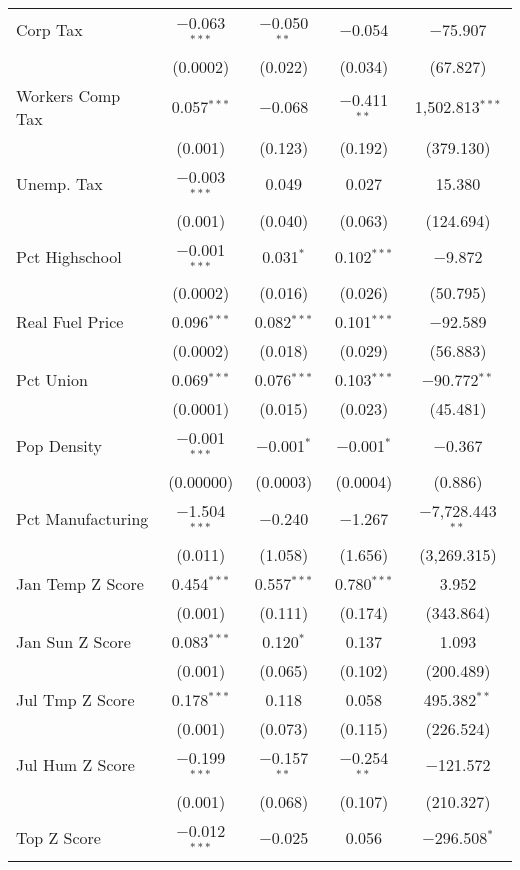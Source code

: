 \begin{table}[!htbp]
\begin{tabular}{@{\extracolsep{5pt}}lcccc}
  Corp Tax & $-$0.063$^{***}$ & $-$0.050$^{**}$ & $-$0.054 & $-$75.907 \\ 
  & (0.0002) & (0.022) & (0.034) & (67.827) \\ 
  Workers Comp Tax & 0.057$^{***}$ & $-$0.068 & $-$0.411$^{**}$ & 1,502.813$^{***}$ \\ 
  & (0.001) & (0.123) & (0.192) & (379.130) \\ 
  Unemp. Tax & $-$0.003$^{***}$ & 0.049 & 0.027 & 15.380 \\ 
  & (0.001) & (0.040) & (0.063) & (124.694) \\ 
  Pct Highschool & $-$0.001$^{***}$ & 0.031$^{*}$ & 0.102$^{***}$ & $-$9.872 \\ 
  & (0.0002) & (0.016) & (0.026) & (50.795) \\ 
  Real Fuel Price & 0.096$^{***}$ & 0.082$^{***}$ & 0.101$^{***}$ & $-$92.589 \\ 
  & (0.0002) & (0.018) & (0.029) & (56.883) \\ 
  Pct Union & 0.069$^{***}$ & 0.076$^{***}$ & 0.103$^{***}$ & $-$90.772$^{**}$ \\ 
  & (0.0001) & (0.015) & (0.023) & (45.481) \\ 
  Pop Density & $-$0.001$^{***}$ & $-$0.001$^{*}$ & $-$0.001$^{*}$ & $-$0.367 \\ 
  & (0.00000) & (0.0003) & (0.0004) & (0.886) \\ 
  Pct Manufacturing & $-$1.504$^{***}$ & $-$0.240 & $-$1.267 & $-$7,728.443$^{**}$ \\ 
  & (0.011) & (1.058) & (1.656) & (3,269.315) \\ 
  Jan Temp Z Score & 0.454$^{***}$ & 0.557$^{***}$ & 0.780$^{***}$ & 3.952 \\ 
  & (0.001) & (0.111) & (0.174) & (343.864) \\ 
  Jan Sun Z Score & 0.083$^{***}$ & 0.120$^{*}$ & 0.137 & 1.093 \\ 
  & (0.001) & (0.065) & (0.102) & (200.489) \\ 
  Jul Tmp Z Score & 0.178$^{***}$ & 0.118 & 0.058 & 495.382$^{**}$ \\ 
  & (0.001) & (0.073) & (0.115) & (226.524) \\ 
  Jul Hum Z Score & $-$0.199$^{***}$ & $-$0.157$^{**}$ & $-$0.254$^{**}$ & $-$121.572 \\ 
  & (0.001) & (0.068) & (0.107) & (210.327) \\ 
  Top Z Score & $-$0.012$^{***}$ & $-$0.025 & 0.056 & $-$296.508$^{*}$ \\ 

\end{tabular}
\end{table}

